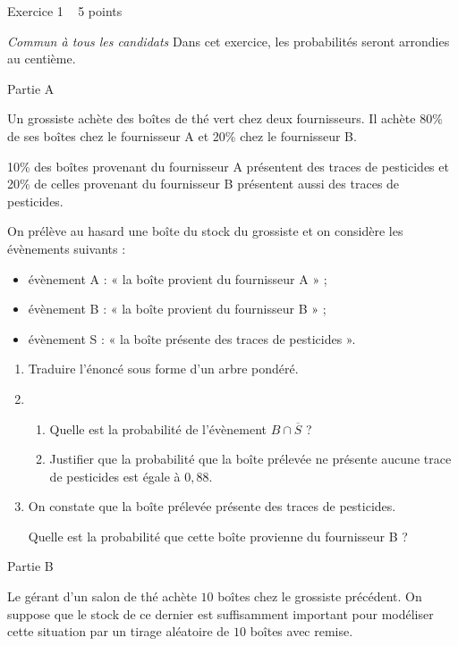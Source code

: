 
%
\begin{h2}Exercice 1   5 points\end{h2}
\textit{Commun à tous les candidats}
Dans cet exercice, les probabilités seront arrondies au centième.
\begin{h3}Partie A\end{h3}
Un grossiste achète des boîtes de thé vert chez deux fournisseurs. Il achète 80\% de ses boîtes chez le fournisseur A et 20\% chez le fournisseur B.
\par
10\% des boîtes provenant du fournisseur A présentent des traces de pesticides et 20\% de celles provenant du fournisseur B présentent aussi des traces de pesticides.
\par
On prélève au hasard une boîte du stock du grossiste et on considère les évènements suivants :
\begin{itemize}
     \item
     évènement A : « la boîte provient du fournisseur A » ;
     \item
     évènement B : « la boîte provient du fournisseur B » ;
     \item
     évènement S : « la boîte présente des traces de pesticides ».
\end{itemize}
\begin{enumerate}
     \item
     Traduire l'énoncé sous forme d'un arbre pondéré.
     \item
     \begin{enumerate}[label=\alph*.]
          \item
          Quelle est la probabilité de l'évènement $B \cap  \overline{S}$ ?
          \item
     Justifier que la probabilité que la boîte prélevée ne présente aucune trace de pesticides est égale à $0,88$.\end{enumerate}
     \item
     On constate que la boîte prélevée présente des traces de pesticides.
     \par
     Quelle est la probabilité que cette boîte provienne du fournisseur B ?
\end{enumerate}
\begin{h3}Partie B\end{h3}
Le gérant d'un salon de thé achète $10$ boîtes chez le grossiste précédent. On suppose que le stock de ce dernier est suffisamment important pour modéliser cette situation par un tirage aléatoire de $10$ boîtes avec remise.
